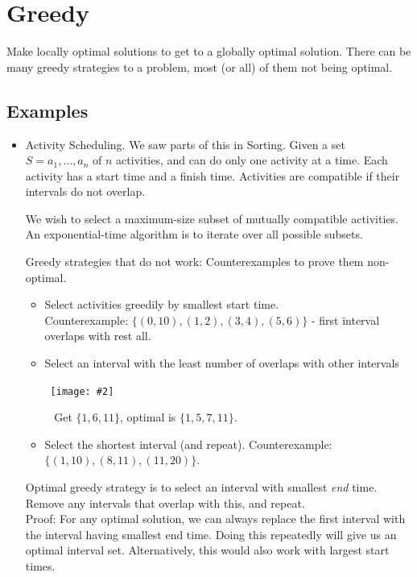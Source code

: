 \documentclass{article}
\newcommand{\I}[1]{\textit{#1}}
\newcommand{\image}[2]{\
    \begin{center}\
        \texttt{[image: \#2]}\
    \end{center}\
}
\begin{document}
\begin{sloppypar}
    \newpage

    \section{Greedy}
    Make locally optimal solutions to get to a globally optimal solution. There can be many greedy strategies to a problem, most (or all) of them not being optimal.
    
    \subsection{Examples}
    \begin{itemize}
        \item Activity Scheduling. We saw parts of this in Sorting. Given a set $S = {a_1, \dots, a_n}$ of $n$ activities, and can do only one activity at a time. Each activity has a start time and a finish time. Activities are compatible if their intervals do not overlap.
        \noindent \par We wish to select a maximum-size subset of mutually compatible activities. An exponential-time algorithm is to iterate over all possible subsets.
        \noindent \par Greedy strategies that do not work: Counterexamples to prove them non-optimal.
        \begin{itemize}
            \item Select activities greedily by smallest start time.\\
            Counterexample: $\{(0,10), (1,2), (3,4), (5,6)\}$ - first interval overlaps with rest all.
            \item Select an interval with the least number of overlaps with other intervals
            \image{0.7}{../images/act-sched-1.png}
            Get $\{1, 6, 11\}$, optimal is $\{1, 5, 7, 11\}$.
            \item Select the shortest interval (and repeat). Counterexample: $\{(1,10), (8,11), (11,20)\}$.
        \end{itemize}
        Optimal greedy strategy is to select an interval with smallest \I{end} time. Remove any intervals that overlap with this, and repeat.\\
        \noindent Proof: For any optimal solution, we can always replace the first interval with the interval having smallest end time. Doing this repeatedly will give us an optimal interval set. Alternatively, this would also work with largest start times.


\end{itemize}
\end{sloppypar}
\end{document}

